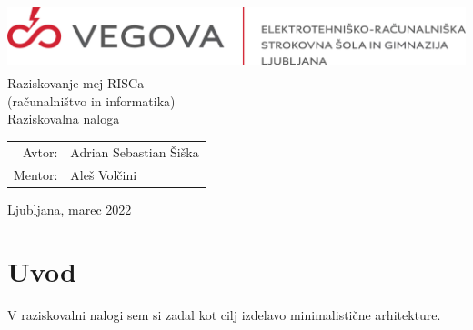 \documentclass[12pt]{article}
\begin{document}
\linespread{1.25}
\begin{titlepage}
  \begin{center}
    \includegraphics[height=2cm]{slike/vegova.png}\\
    \Huge
    \vspace*{6cm}
    Raziskovanje mej RISCa\\
    \Large
    (računalništvo in informatika)\\
    Raziskovalna naloga\\
  \end{center}
  \vspace{8cm}
  \begin{tabular}{rl}
    Avtor: & Adrian Sebastian Šiška\\
    Mentor: & Aleš Volčini
  \end{tabular}
  \vspace{1cm}
  \begin{center}
    Ljubljana, marec 2022
  \end{center}
\end{titlepage}

\pagebreak
{}

\tableofcontents

\pagebreak

\listoffigures

\pagebreak

%
%


\section{Uvod}
V raziskovalni nalogi sem si zadal kot cilj izdelavo minimalistične arhitekture.
\end{document}
